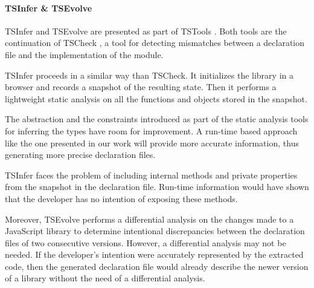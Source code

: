 \documentclass[sigplan,screen]{acmart}
\begin{document}






\paragraph*{TSInfer \& TSEvolve}
TSInfer and TSEvolve are presented as part of TSTools
\cite{DBLP:conf/fase/KristensenM17}. Both tools are the continuation of TSCheck
\cite{DBLP:conf/oopsla/FeldthausM14}, a tool for detecting mismatches between a
declaration file and the implementation of the module. 

TSInfer proceeds in a similar way than TSCheck. It initializes the library in a browser
and records a snapshot of the resulting state.  Then it performs a lightweight static
analysis on all the functions and objects stored in the snapshot. 

The abstraction and the constraints introduced as part of the static analysis tools
for inferring the types have room for improvement. A run-time based approach like the one
presented in our work will provide more accurate information, thus generating more precise
declaration files.

TSInfer faces the problem
of including internal methods and private properties from the snapshot in the declaration file. Run-time
information would have shown that the developer has no intention of exposing these
methods. 

Moreover, TSEvolve performs a differential analysis on the changes made to a JavaScript
library to determine intentional discrepancies between the declaration files of two
consecutive versions. However, a differential analysis may not be needed. If the
developer's intention were accurately represented by the extracted code, then the generated
declaration file would already describe the newer version of a library without the need of
a differential analysis.
\end{document}
